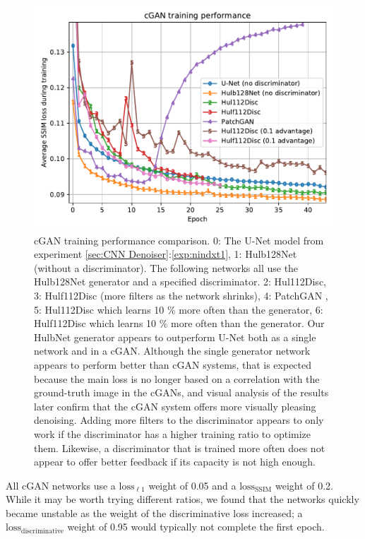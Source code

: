 \begin{figure}[!htbp]
\centering
\includegraphics[width=1\linewidth]{gfx/graphs/cgan-comp.pdf}
\caption[cGAN learning curve]{
cGAN training performance comparison. 0: The U-Net model from experiment \ref{sec:CNN Denoiser}:\ref{exp:nindxt1}, 1: Hulb128Net (without a discriminator). The following networks all use the Hulb128Net generator and a specified discriminator. 2: Hul112Disc, 3: Hulf112Disc (more filters as the network shrinks), 4: PatchGAN \cite{pix2pix}, 5: Hul112Disc which learns 10 \% more often than the generator, 6: Hulf112Disc which learns 10 \% more often than the generator.
Our HulbNet generator appears to outperform U-Net both as a single network and in a \acs{cGAN}. Although the single generator network appears to perform better than \ac{cGAN} systems, that is expected because the main loss is no longer based on a correlation with the ground-truth image in the \acp{cGAN}, and visual analysis of the results later confirm that the \acs{cGAN} system offers more visually pleasing denoising. Adding more filters to the discriminator appears to only work if the discriminator has a higher training ratio to optimize them. Likewise, a discriminator that is trained more often does not appear to offer better feedback if its capacity is not high enough.}
\label{fig:cgan-comp}
\end{figure}

All \ac{cGAN} networks use a $\text{loss}_{\ell 1}$ weight of 0.05 and a $\text{loss}_\text{SSIM}$ weight of 0.2. While it may be worth trying different ratios, we found that the networks quickly became unstable as the weight of the discriminative loss increased; a $\text{loss}_\text{discriminative}$ weight of 0.95 would typically not complete the first epoch.

